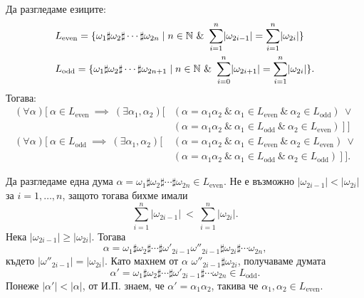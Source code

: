 \begin{prop}
  Да разгледаме езиците:
  \begin{align*}
    & L_{\text{even}} = \{\omega_1 \sharp \omega_2 \sharp \cdots \sharp \omega_{2n} \mid n\in\Nat\ \&\ \sum^n_{i=1}\abs{\omega_{2i-1}} = \sum^{n}_{i=1}\abs{\omega_{2i}}\}\\
    & L_{\text{odd}} = \{\omega_1 \sharp \omega_2 \sharp \cdots \sharp \omega_{2n+1} \mid n\in\Nat\ \&\ \sum^n_{i=0}\abs{\omega_{2i+1}} = \sum^{n}_{i=1}\abs{\omega_{2i}}\}.
  \end{align*}
  Тогава:
  \begin{align*}
    (\forall \alpha)[\ \alpha\in L_{\text{even}}\ \implies\ (\exists \alpha_1,\alpha_2)[& ( \alpha = \alpha_1\alpha_2\ \&\ \alpha_1 \in L_{\text{even}}\ \&\ \alpha_2 \in L_{\text{odd}})\ \lor\\
                                                                                        &( \alpha = \alpha_1\alpha_2\ \&\ \alpha_1 \in L_{\text{odd}}\ \&\ \alpha_2 \in L_{\text{even}})\ ]\ ]\\
    (\forall \alpha)[\ \alpha\in L_{\text{odd}}\ \implies\ (\exists \alpha_1,\alpha_2)[&( \alpha = \alpha_1\alpha_2\ \&\ \alpha_1 \in L_{\text{even}}\ \&\ \alpha_2 \in L_{\text{even}})\ \lor\\
                                                                                        &( \alpha = \alpha_1\alpha_2\ \&\ \alpha_1 \in L_{\text{odd}}\ \&\ \alpha_2 \in L_{\text{odd}})\ ]\ ].
  \end{align*}
\end{prop}
\begin{hint}
  Да разгледаме една дума $\alpha = \omega_1 \sharp \omega_2 \sharp \cdots \sharp \omega_{2n} \in L_{\text{even}}$.
  Не е възможно $|\omega_{2i-1}| < |\omega_{2i}|$ за $i = 1,\dots,n$, защото тогава бихме имали 
  \[\sum^n_{i=1}|\omega_{2i-1}|\ <\ \sum^n_{i=1}|\omega_{2i}|.\]
  Нека $|\omega_{2i-1}| \geq |\omega_{2i}|$.
  Тогава
  \[\alpha = \omega_1 \sharp \omega_2 \sharp \cdots \sharp\omega'_{2i-1}\omega''_{2i-1}\sharp\omega_{2i}\sharp\cdots \omega_{2n},\]
  където $|\omega''_{2i-1}| = |\omega_{2i}|$.
  Като махнем от $\alpha$ $\omega''_{2i-1}\sharp\omega_{2i}$, 
  получаваме думата
  \[\alpha' = \omega_1 \sharp \omega_2 \sharp \cdots \sharp\omega'_{2i-1}\sharp\cdots \omega_{2n} \in L_{\text{odd}}.\]
  Понеже $|\alpha'| < |\alpha|$, от И.П. знаем, че $\alpha' = \alpha_1\alpha_2$, такива че
  $\alpha_1,\alpha_2 \in L_{\text{even}}$.
\end{hint}


